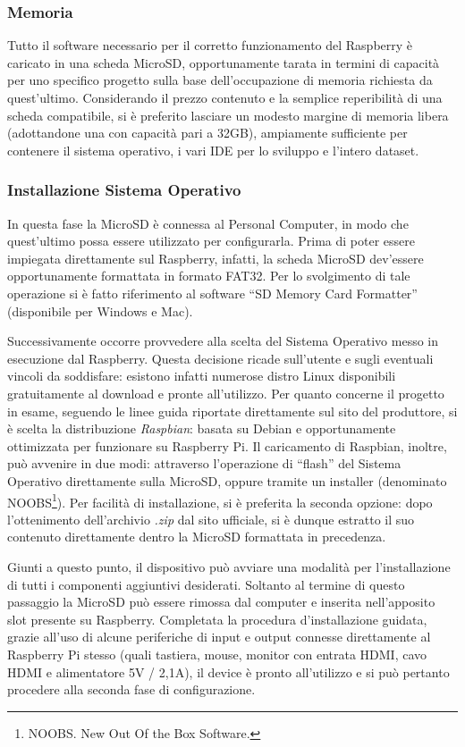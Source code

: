 \documentclass[12pt]{article}
\newcommand{\quotes}[1]{``#1''}
\begin{document}
\subsubsection{Memoria}
Tutto il software necessario per il corretto funzionamento del Raspberry è caricato in una scheda MicroSD, opportunamente tarata in termini di capacità per uno specifico progetto sulla base dell'occupazione di memoria richiesta da quest'ultimo. Considerando il prezzo contenuto e la semplice reperibilità di una scheda compatibile, si è preferito lasciare un modesto margine di memoria libera (adottandone una con capacità pari a 32GB), ampiamente sufficiente per contenere il sistema operativo, i vari IDE per lo sviluppo e l'intero dataset.

\subsubsection{Installazione Sistema Operativo}
In questa fase la MicroSD è connessa al Personal Computer, in modo che quest'ultimo possa essere utilizzato per configurarla. Prima di poter essere impiegata direttamente sul Raspberry, infatti, la scheda MicroSD dev'essere opportunamente formattata in formato FAT32. Per lo svolgimento di tale operazione si è fatto riferimento al software \quotes{SD Memory Card Formatter} (disponibile per Windows e Mac).

Successivamente occorre provvedere alla scelta del Sistema Operativo messo in esecuzione dal Raspberry. Questa decisione ricade sull'utente e sugli eventuali vincoli da soddisfare: esistono infatti numerose distro Linux disponibili gratuitamente al download e pronte all'utilizzo. Per quanto concerne il progetto in esame, seguendo le linee guida riportate direttamente sul sito del produttore, si è scelta la distribuzione \textit{Raspbian}: basata su Debian e opportunamente ottimizzata per funzionare su Raspberry Pi. Il caricamento di Raspbian, inoltre, può avvenire in due modi: attraverso l'operazione di \quotes{flash} del Sistema Operativo direttamente sulla MicroSD, oppure tramite un installer (denominato NOOBS\footnote{NOOBS. New Out Of the Box Software.}). Per facilità di installazione, si è preferita la seconda opzione: dopo l'ottenimento dell'archivio \textit{.zip} dal sito ufficiale, si è dunque estratto il suo contenuto direttamente dentro la MicroSD formattata in precedenza.

Giunti a questo punto, il dispositivo può avviare una modalità per l'installazione di tutti i componenti aggiuntivi desiderati. Soltanto al termine di questo passaggio la MicroSD può essere rimossa dal computer e inserita nell'apposito slot presente su Raspberry. Completata la procedura d'installazione guidata, grazie all'uso di alcune periferiche di input e output connesse direttamente al Raspberry Pi stesso (quali tastiera, mouse, monitor con entrata HDMI, cavo HDMI e alimentatore 5V / 2,1A), il device è pronto all'utilizzo e si può pertanto procedere alla seconda fase di configurazione.
\end{document}

